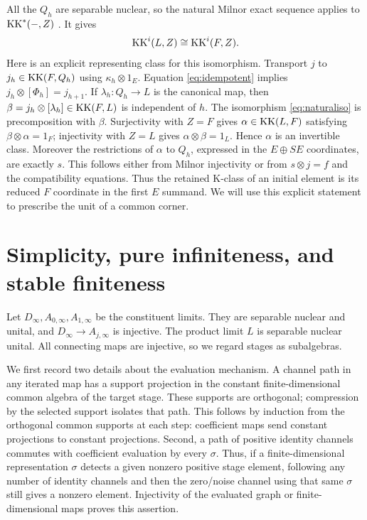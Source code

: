 \documentclass[11pt]{article}
\theoremstyle{remark}\newtheorem{remark}[theorem]{Remark}
\begin{document}
All the $Q_h$ are separable nuclear, so the natural Milnor exact
sequence applies to $\operatorname{KK}^*(-,Z)$
\cite[Theorems 1.12 and 1.14(b)]{RS}. It gives
\begin{equation}\label{eq:naturaliso}
                        \operatorname{KK}^i(L,Z)\cong\operatorname{KK}^i(F,Z).
\end{equation}
Here is an explicit representing class for this isomorphism. Transport
$j$ to $j_h\in\operatorname{KK}(F,Q_h)$ using $\kappa_h\otimes1_E$.
Equation \eqref{eq:idempotent} implies
$j_h\otimes[\Phi_h]=j_{h+1}$. If $\lambda_h:Q_h\to L$ is the canonical
map, then $\beta=j_h\otimes[\lambda_h]\in\operatorname{KK}(F,L)$ is independent of $h$.
The isomorphism \eqref{eq:naturaliso} is precomposition with $\beta$.
Surjectivity with $Z=F$ gives $\alpha\in\operatorname{KK}(L,F)$ satisfying
$\beta\otimes\alpha=1_F$; injectivity with $Z=L$ gives
$\alpha\otimes\beta=1_L$. Hence $\alpha$ is an invertible class.
Moreover the restrictions of $\alpha$ to $Q_h$, expressed in the
$E\oplus SE$ coordinates, are exactly $s$. This follows either from
Milnor injectivity or from $s\otimes j=f$ and the compatibility equations.
Thus the retained K-class of an initial element is its reduced $F$
coordinate in the first $E$ summand. We will use this explicit statement
to prescribe the unit of a common corner.

\section{Simplicity, pure infiniteness, and stable finiteness}
Let $D_\infty,A_{0,\infty},A_{1,\infty}$ be the constituent limits.
They are separable nuclear and unital, and $D_\infty\to A_{j,\infty}$
is injective. The product limit $L$ is separable nuclear unital.
All connecting maps are injective, so we regard stages as subalgebras.

We first record two details about the evaluation mechanism. A channel
path in any iterated map has a support projection in the constant
finite-dimensional common algebra of the target stage. These supports
are orthogonal; compression by the selected support isolates that path.
This follows by induction from the orthogonal common supports at each
step: coefficient maps send constant projections to constant projections.
Second, a path of positive identity channels commutes with coefficient
evaluation by every $\sigma$. Thus, if a finite-dimensional representation
$\sigma$ detects a given nonzero positive stage element, following any
number of identity channels and then the zero/noise channel using that
same $\sigma$ still gives a nonzero element. Injectivity of the evaluated
graph or finite-dimensional maps proves this assertion.
\end{document}
